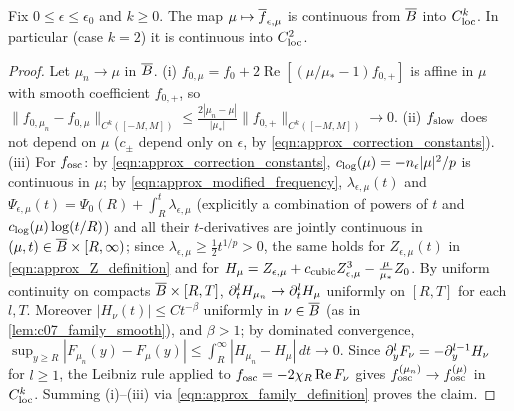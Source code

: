 \begin{lemma}
  \label{lem:c07_family_continuity}
  Fix $0\le\epsilon\le\epsilon_0$ and $k\ge0$. The map $\mu\mapsto\overline{f}_{\epsilon,\mu}$ is continuous
  from $\overline{B}$ into $C^k_{\textup{loc}}$. In particular (case $k=2$) it is continuous into $C^2_{\textup{loc}}$.
\end{lemma}
\begin{proof}
  Let $\mu_n\to\mu$ in $\overline{B}$. (i) $f_{0,\mu}=f_0+2\operatorname{Re}[(\mu/\mu_*-1)f_{0,+}]$ is affine in
  $\mu$ with smooth coefficient $f_{0,+}$, so $\|f_{0,\mu_n}-f_{0,\mu}\|_{C^k([-M,M])}\le\frac{2|\mu_n-\mu|}{|\mu_*|}\|f_{0,+}\|_{C^k([-M,M])}\to0$.
  (ii) $f_{\textup{slow}}$ does not depend on $\mu$ ($c_\pm$ depend only on $\epsilon$, by \eqref{eqn:approx_correction_constants}).
  (iii) For $f_{\textup{osc}}$: by \eqref{eqn:approx_correction_constants}, $c_{\textup{log}}(\mu)=-n_\epsilon|\mu|^2/p$ is continuous in $\mu$;
  by \eqref{eqn:approx_modified_frequency}, $\lambda_{\epsilon,\mu}(t)$ and
  $\Psi_{\epsilon,\mu}(t)=\Psi_0(R)+\int_R^t\lambda_{\epsilon,\mu}$ (explicitly a combination of powers of $t$ and
  $c_{\textup{log}}(\mu)\log(t/R)$) and all their $t$-derivatives are jointly continuous in
  $(\mu,t)\in\overline{B}\times[R,\infty)$; since $\lambda_{\epsilon,\mu}\ge\frac12t^{1/p}>0$, the same holds for
  $Z_{\epsilon,\mu}(t)$ in \eqref{eqn:approx_Z_definition} and for $H_\mu=Z_{\epsilon,\mu}+c_{\textup{cubic}}Z_{\epsilon,\mu}^3-\frac\mu{\mu_*}Z_0$.
  By uniform continuity on compacts $\overline{B}\times[R,T]$, $\partial_t^lH_{\mu_n}\to\partial_t^lH_\mu$ uniformly on
  $[R,T]$ for each $l,T$. Moreover $|H_\nu(t)|\le Ct^{-\beta}$ uniformly in $\nu\in\overline{B}$ (as in
  \cref{lem:c07_family_smooth}), and $\beta>1$; by dominated convergence,
  $\sup_{y\ge R}|F_{\mu_n}(y)-F_\mu(y)|\le\int_R^\infty|H_{\mu_n}-H_\mu|\,dt\to0$. Since
  $\partial_y^lF_\nu=-\partial_y^{l-1}H_\nu$ for $l\ge1$, the Leibniz rule applied to
  $f_{\textup{osc}}=-2\chi_R\operatorname{Re}F_\nu$ gives $f_{\textup{osc}}^{(\mu_n)}\to f_{\textup{osc}}^{(\mu)}$ in $C^k_{\textup{loc}}$.
  Summing (i)--(iii) via \eqref{eqn:approx_family_definition} proves the claim.
\end{proof}

